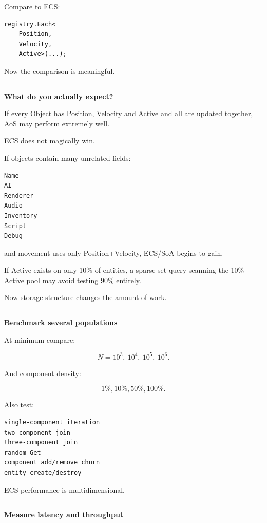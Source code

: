 Compare to ECS:

\begin{verbatim}
registry.Each<
    Position,
    Velocity,
    Active>(...);
\end{verbatim}

Now the comparison is meaningful.

\begin{center}\rule{0.5\linewidth}{0.5pt}\end{center}

\textbf{What do you actually expect?}

If every Object has Position, Velocity and Active and all are updated together, AoS may perform extremely well.

ECS does not magically win.

If objects contain many unrelated fields:

\begin{verbatim}
Name
AI
Renderer
Audio
Inventory
Script
Debug
\end{verbatim}

and movement uses only Position+Velocity, ECS/SoA begins to gain.

If Active exists on only 10\% of entities, a sparse-set query scanning the 10\% Active pool may avoid testing 90\% entirely.

Now storage structure changes the amount of work.

\begin{center}\rule{0.5\linewidth}{0.5pt}\end{center}

\textbf{Benchmark several populations}

At minimum compare:

\[
N=
10^3,\ 10^4,\ 10^5,\ 10^6.
\]

And component density:

\[
1\%,10\%,50\%,100\%.
\]

Also test:

\begin{verbatim}
single-component iteration
two-component join
three-component join
random Get
component add/remove churn
entity create/destroy
\end{verbatim}

ECS performance is multidimensional.

\begin{center}\rule{0.5\linewidth}{0.5pt}\end{center}

\textbf{Measure latency and throughput}

